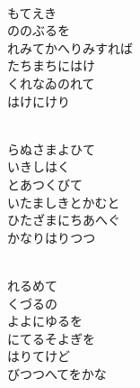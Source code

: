 \documentclass[10pt,b5j]{tarticle} %
\begin{document}
\begin{enumerate}
\begin{minipage}[c]{\blocksize}
    \end{minipage}
    \begin{minipage}[c]{\blocksize}
        
        \vspace{\linespace}
        \item~\\
        もてえき\\
        ののぶるを\\
        れみてかへりみすれば\\
        たちまちにはけ\\
        くれなゐのれて\\
        はけにけり
        
    \end{minipage}
    \begin{minipage}[c]{\blocksize}
        
        \vspace{\linespace}
        \item~\\
        らぬさまよひて\\
        いきしはく\\
        とあつくびて\\
        いたましきとかむと\\
        ひたざまにちあへぐ\\
        かなりはりつつ
        
    \end{minipage}
    \begin{minipage}[c]{\blocksize}
        
        \vspace{\linespace}
        \item~\\
        れるめて\\
        くづるの\\
        よよにゆるを\\
        にてるそよぎを\\
        はりてけど\\
        びつつへてをかな
    
    \end{minipage}
\end{enumerate} %
\end{document}
